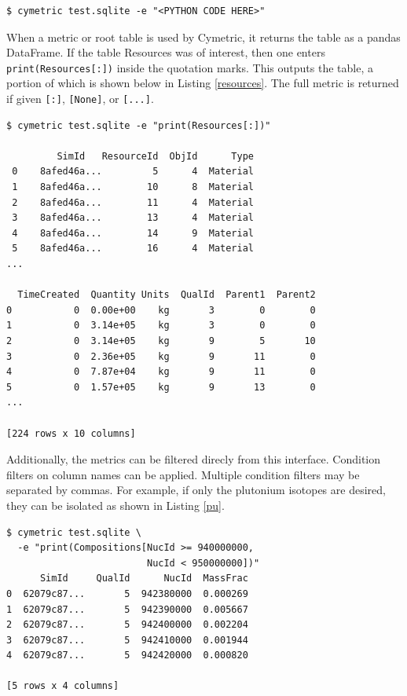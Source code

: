 \documentclass{anstrans}
\newcommand{\code}[1]{{\color{code}\texttt{#1}}}
\begin{document}
\begin{lstlisting}[caption ={Executing Code on a Database}, label=dashe]
$ cymetric test.sqlite -e "<PYTHON CODE HERE>"
\end{lstlisting} 

When a metric or root table is used by Cymetric, it returns the table 
as a pandas DataFrame. \cite{pandas0.15.2} If the table Resources was of interest, 
then one enters \code{print(Resources[:])} inside the quotation marks. 
This outputs the table, a portion of which is shown below in Listing 
\ref{resources}. The full metric is returned if given \code{[:]}, 
\code{[None]}, or \code{[...]}. 

\begin{lstlisting}[caption={Printing a Root Table}, label=resources]
$ cymetric test.sqlite -e "print(Resources[:])"

         SimId   ResourceId  ObjId      Type  
 0    8afed46a...         5      4  Material   
 1    8afed46a...        10      8  Material   
 2    8afed46a...        11      4  Material   
 3    8afed46a...        13      4  Material   
 4    8afed46a...        14      9  Material   
 5    8afed46a...        16      4  Material   
...

  TimeCreated  Quantity Units  QualId  Parent1  Parent2  
0           0  0.00e+00    kg       3        0        0  
1           0  3.14e+05    kg       3        0        0  
2           0  3.14e+05    kg       9        5       10  
3           0  2.36e+05    kg       9       11        0  
4           0  7.87e+04    kg       9       11        0  
5           0  1.57e+05    kg       9       13        0  
...

[224 rows x 10 columns]
\end{lstlisting}

Additionally, the metrics can be filtered direcly from this interface.
Condition filters on column names can be applied. Multiple condition
filters may be separated by commas. For example, if only the plutonium 
isotopes are desired, they can be isolated as shown in Listing \ref{pu}. 

\begin{lstlisting}[caption ={Filtering a Root Table}, label=pu]
$ cymetric test.sqlite \
  -e "print(Compositions[NucId >= 940000000, 
                         NucId < 950000000])"
      SimId     QualId      NucId  MassFrac
0  62079c87...       5  942380000  0.000269
1  62079c87...       5  942390000  0.005667
2  62079c87...       5  942400000  0.002204
3  62079c87...       5  942410000  0.001944
4  62079c87...       5  942420000  0.000820

[5 rows x 4 columns]
\end{lstlisting}
\end{document}
